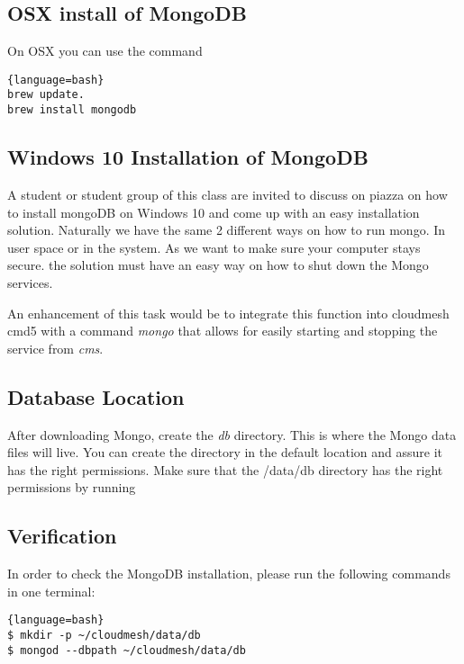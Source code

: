 \subsection{OSX install of MongoDB}

On OSX you can use the command

\begin{lstlisting}{language=bash}
brew update.
brew install mongodb
\end{lstlisting}

\subsection{Windows 10 Installation of MongoDB}

\begin{exercise}

A student or student group of this class are invited to discuss on
piazza on how to install mongoDB on Windows 10 and come up with an
easy installation solution. Naturally we have the same 2 different ways
on how to run mongo. In user space or in the system. As we want to
make sure your computer stays secure. the solution must have an easy
way on how to shut down the Mongo services.

An enhancement of this task would be to integrate this function into
cloudmesh cmd5 with a command {\em mongo} that allows for easily
starting and stopping the service from {\em cms}.
\end{exercise}


\subsection{Database Location}
After downloading Mongo, create the {\em db} directory. This is where
the Mongo data files will live. You can create the directory in the
default location and assure it has the right permissions. Make sure
that the /data/db directory has the right permissions by running

\subsection{Verification}

In order to check the MongoDB installation, please run the following
commands in one terminal:

\begin{lstlisting}{language=bash}
$ mkdir -p ~/cloudmesh/data/db
$ mongod --dbpath ~/cloudmesh/data/db
\end{lstlisting}

